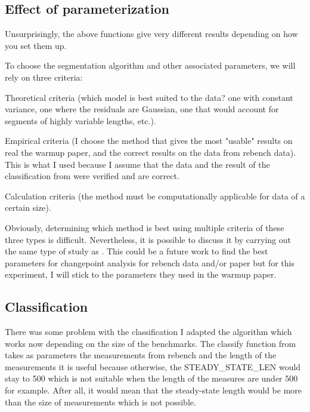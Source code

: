 \documentclass{article}
\begin{document}
\subsection{Effect of parameterization}

Unsurprisingly, the above functions give very different results depending on how you set them up.

To choose the segmentation algorithm and other associated parameters, we will rely on three criteria:

Theoretical criteria (which model is best suited to the data? one with constant variance, one where the residuals are Gaussian, one that would account for segments of highly variable lengths, etc.).

Empirical criteria (I choose the method that gives the most "usable" results on real the warmup paper, and the correct results on the data from rebench data). This is what I used because I assume that the data and the result of the classification from \cite{barrett2017virtual} were verified and are correct.

Calculation criteria (the method must be computationally applicable for data of a certain size).

Obviously, determining which method is best using multiple criteria of these three types is difficult. Nevertheless, it is possible to discuss it by carrying out the same type of study as \cite{leviandier2012comparison}. This could be a future work to find the best parameters for changepoint analysis for rebench data and/or \cite{barrett2017virtual} paper but for this experiment, I will stick to the parameters they used in the warmup paper.

\subsection{Classification}


There was some problem with the classification I adapted the algorithm which works now depending on the size of the benchmarks.
The classify function from \cite{barrett2017virtual} takes as parameters the measurements from rebench and the length of the measurements it is useful because otherwise, the STEADY\_STATE\_LEN would stay to 500 which is not suitable when the length of the measures are under 500 for example. After all, it would mean that the steady-state length would be more than the size of measurements which is not possible.
\end{document}
